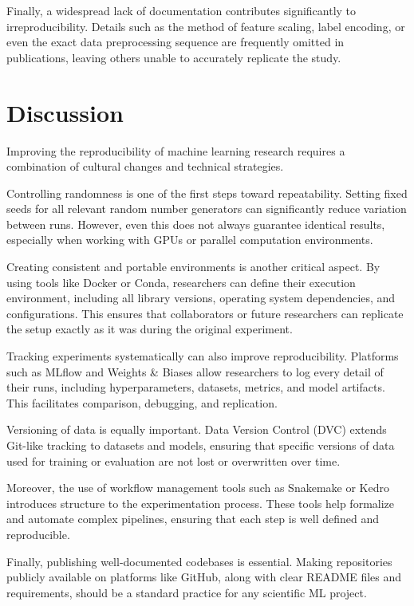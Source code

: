 \documentclass[11pt]{article}
\begin{document}
Finally, a widespread lack of documentation contributes significantly to irreproducibility. Details such as the method of feature scaling, label encoding, or even the exact data preprocessing sequence are frequently omitted in publications, leaving others unable to accurately replicate the study.


\section{Discussion}
\label{sec:system}
Improving the reproducibility of machine learning research requires a combination of cultural changes and technical strategies.

Controlling randomness is one of the first steps toward repeatability. Setting fixed seeds for all relevant random number generators can significantly reduce variation between runs. However, even this does not always guarantee identical results, especially when working with GPUs or parallel computation environments.

Creating consistent and portable environments is another critical aspect. By using tools like Docker or Conda, researchers can define their execution environment, including all library versions, operating system dependencies, and configurations. This ensures that collaborators or future researchers can replicate the setup exactly as it was during the original experiment.

Tracking experiments systematically can also improve reproducibility. Platforms such as MLflow and Weights \& Biases allow researchers to log every detail of their runs, including hyperparameters, datasets, metrics, and model artifacts. This facilitates comparison, debugging, and replication.

Versioning of data is equally important. Data Version Control (DVC) extends Git-like tracking to datasets and models, ensuring that specific versions of data used for training or evaluation are not lost or overwritten over time.

Moreover, the use of workflow management tools such as Snakemake or Kedro introduces structure to the experimentation process. These tools help formalize and automate complex pipelines, ensuring that each step is well defined and reproducible.

Finally, publishing well-documented codebases is essential. Making repositories publicly available on platforms like GitHub, along with clear README files and requirements, should be a standard practice for any scientific ML project.
\end{document}
